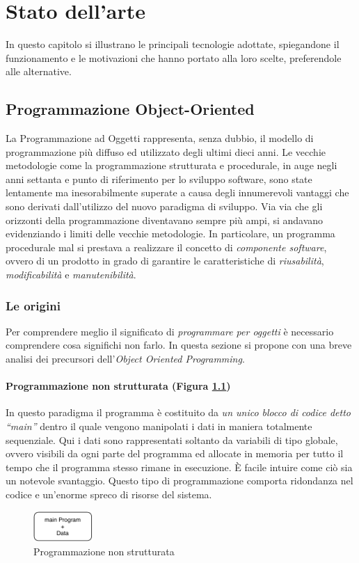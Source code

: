 \chapter{Stato dell'arte}
\label{chap:stateofart}
In questo capitolo si illustrano le principali tecnologie adottate, spiegandone il funzionamento e le motivazioni che hanno portato alla loro scelte, preferendole alle alternative.

\section{Programmazione Object-Oriented}
La Programmazione ad Oggetti rappresenta, senza dubbio, il modello di programmazione più diffuso ed utilizzato degli ultimi dieci anni.
Le vecchie metodologie come la programmazione strutturata e procedurale, in auge negli anni settanta e punto di riferimento per lo sviluppo software, sono state lentamente ma inesorabilmente superate a causa degli innumerevoli vantaggi che sono derivati dall’utilizzo del nuovo paradigma di sviluppo. Via via che gli orizzonti della programmazione diventavano sempre più ampi, si andavano evidenziando i limiti delle vecchie metodologie. In particolare, un programma procedurale mal si prestava a realizzare il concetto di \textit{componente software}, ovvero di un prodotto in grado di garantire le caratteristiche di \textit{riusabilità}, \textit{modificabilità} e \textit{manutenibilità}.
\subsection{Le origini}
Per comprendere meglio il significato di \textsl{programmare per oggetti} è necessario comprendere cosa significhi non farlo. In questa sezione si propone con una breve analisi dei precursori dell'\textit{Object Oriented Programming}.

\subsubsection{Programmazione non strutturata (Figura \ref{fig:nonstructured-programming})}
In questo paradigma il programma è costituito da \textit{un unico blocco di codice detto “main”} dentro il quale vengono manipolati i dati in maniera totalmente sequenziale. Qui i dati sono rappresentati soltanto da variabili di tipo globale, ovvero visibili da ogni parte del programma ed allocate in memoria per tutto il tempo che il programma stesso rimane in esecuzione. È facile intuire come ciò sia un notevole svantaggio. Questo tipo di programmazione comporta ridondanza nel codice e un'enorme spreco di risorse del sistema. 
\begin{figure}[H]
    \centering
    \includegraphics[width=0.20\textwidth]{images/01_1_non_structured_data.pdf}
    \caption{Programmazione non strutturata}
    \label{fig:nonstructured-programming}
\end{figure}

